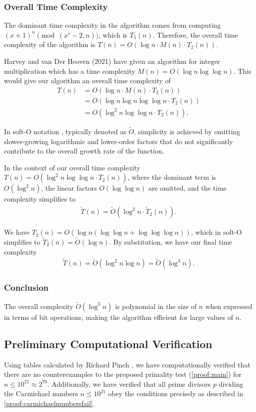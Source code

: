 \documentclass{article}
\theoremstyle{plain}
\theoremstyle{definition}
\begin{document}
\subsubsection{Overall Time Complexity}
The dominant time complexity in the algorithm comes from computing $(x+1)^n \pmod{(x^r-2,n)}$, which is $T_5(n)$. Therefore, the overall time complexity of the algorithm is $T(n) = O(\log n \cdot M(n) \cdot T_2(n))$.

Harvey and van Der Heoven (2021) \cite{harveyvanderhoeven2021} have given an algorithm for integer multiplication which has a time complexity $M(n) = O(\log n \log\log n)$. This would give our algorithm an overall time complexity of
\begin{align*}
    T(n) &= O(\log n \cdot  M(n) \cdot  T_2(n))
    \\ &= O(\log n \log n \log\log n \cdot  T_2(n))
    \\ &= O(\log^2 n \log\log n \cdot  T_2(n)) .
\end{align*}

In soft-O notation \cite{gathengerhard2013softo}, typically denoted as $\tilde{O}$, simplicity is achieved by omitting slower-growing logarithmic and lower-order factors that do not significantly contribute to the overall growth rate of the function.

In the context of our overall time complexity $T(n) = O(\log^2 n \log\log n \cdot T_2(n))$, where the dominant term is $O(\log^2 n)$, the linear factors $O(\log\log n)$ are omitted, and the time complexity simplifies to
\begin{align*}
    \tilde{T}(n) = \tilde{O}(\log^2 n \cdot \tilde{T}_2(n)) .
\end{align*}

We have $T_2(n) = O(\log n (\log \log n + \log \log \log n))$, which in soft-O simplifies to $\tilde{T}_2(n) = \tilde{O}(\log n)$. By substitution, we have our final time complexity
\begin{align*}
    \tilde{T}(n) = \tilde{O}(\log^2 n \log n) = \tilde{O}(\log^3 n) .
\end{align*}

\subsubsection{Conclusion}
The overall complexity $\tilde{O}(\log^3 n)$ is polynomial in the size of $n$ when expressed in terms of bit operations, making the algorithm efficient for large values of $n$.

\subsection{Preliminary Computational Verification}
Using tables calculated by Richard Pinch \cite{pinch2007carmichael}, we have computationally verified that there are no counterexamples to the proposed primality test (\cref{proof:main}) for $n \leq 10^{21} \approx 2^{70}$. Additionally, we have verified that all prime divisors $p$ dividing the Carmichael numbers $n \leq 10^{21}$ obey the conditions precisely as described in \cref{proof:carmichaelnumbersfail}.
\end{document}

